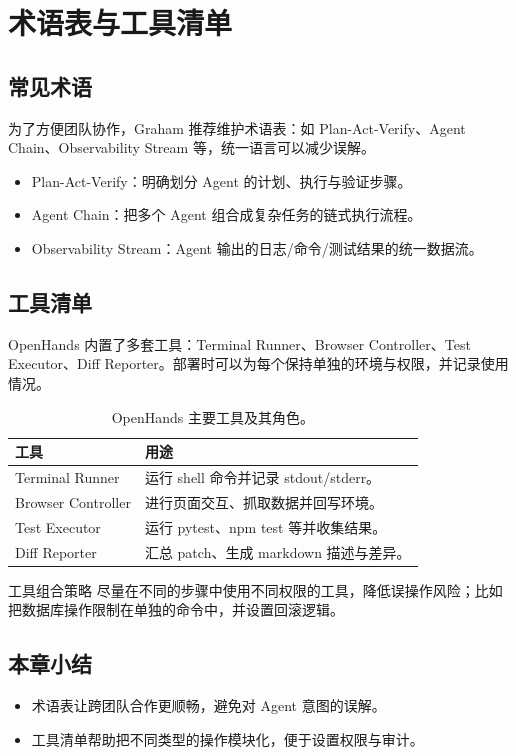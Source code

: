 \section{术语表与工具清单}
\subsection{常见术语}
为了方便团队协作，Graham 推荐维护术语表：如 Plan-Act-Verify、Agent Chain、Observability Stream 等，统一语言可以减少误解。

\begin{itemize}
    \item Plan-Act-Verify：明确划分 Agent 的计划、执行与验证步骤。
    \item Agent Chain：把多个 Agent 组合成复杂任务的链式执行流程。
    \item Observability Stream：Agent 输出的日志/命令/测试结果的统一数据流。
\end{itemize}

\subsection{工具清单}
OpenHands 内置了多套工具：Terminal Runner、Browser Controller、Test Executor、Diff Reporter。部署时可以为每个保持单独的环境与权限，并记录使用情况。

\begin{table}[H]
\centering
\begin{tabular}{p{} p{}}
\toprule
工具 & 用途 \\
\midrule
Terminal Runner & 运行 shell 命令并记录 stdout/stderr。 \\
\midrule
Browser Controller & 进行页面交互、抓取数据并回写环境。 \\
\midrule
Test Executor & 运行 pytest、npm test 等并收集结果。 \\
\midrule
Diff Reporter & 汇总 patch、生成 markdown 描述与差异。 \\
\bottomrule
\end{tabular}
\caption{OpenHands 主要工具及其角色。}
\end{table}

\begin{knowledgebox}{工具组合策略}
尽量在不同的步骤中使用不同权限的工具，降低误操作风险；比如把数据库操作限制在单独的命令中，并设置回滚逻辑。
\end{knowledgebox}

\subsection{本章小结}
\begin{itemize}
    \item 术语表让跨团队合作更顺畅，避免对 Agent 意图的误解。
    \item 工具清单帮助把不同类型的操作模块化，便于设置权限与审计。
\end{itemize}

